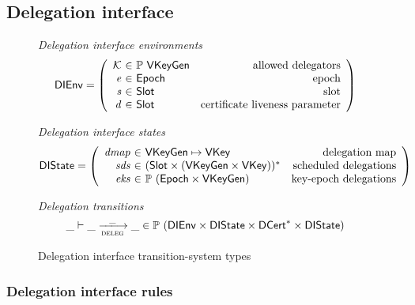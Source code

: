 \newcommand{\DIEnv}{\type{DIEnv}}
\newcommand{\DIState}{\type{DIState}}

\subsection{Delegation interface}
\label{sec:delegation-interface}

\begin{figure}
  \emph{Delegation interface environments}
  \begin{equation*}
    \DIEnv =
    \left(
      \begin{array}{r@{~\in~}lr}
        \mathcal{K} & \powerset{\VKeyGen} & \text{allowed delegators}\\        
        \var{e} & \Epoch & \text{epoch}\\
        \var{s} & \Slot & \text{slot}\\
        \var{d} & \Slot & \text{certificate liveness parameter}
      \end{array}
    \right)
  \end{equation*}

  \emph{Delegation interface states}
  \begin{equation*}
    \DIState
    = \left(
      \begin{array}{r@{~\in~}lr}
        \var{dmap} & \VKeyGen \mapsto \VKey & \text{delegation map}\\
        \var{sds} & \seqof{(\Slot \times (\VKeyGen \times \VKey))} & \text{scheduled delegations}\\
        \var{eks} & \powerset{(\Epoch \times \VKeyGen)} & \text{key-epoch delegations}
      \end{array}
    \right)
  \end{equation*}

  \emph{Delegation transitions}
  \begin{equation*}
    \_ \vdash \_ \trans{deleg}{\_} \_ \in
    \powerset (\DIEnv \times \DIState \times \seqof{\DCert} \times \DIState)
  \end{equation*}    
  \caption{Delegation interface transition-system types}
  \label{fig:ts-types:delegation-interface}
\end{figure}

\subsubsection{Delegation interface rules}
\label{sec:delegation-interface-rules}

